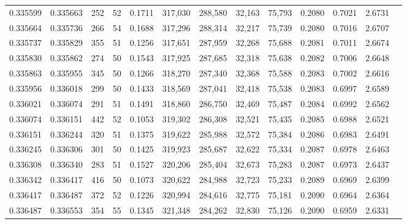 \begin{tabular}{rrrrrrrrrrrrr}
0.335599 & 0.335663 &   252 &  52 &                                     0.1711 & 317,030 & 288,580 &  32,163 &  75,793 & 0.2080 & 0.7021 & 2.6731 \\
0.335664 & 0.335736 &   266 &  54 &                                     0.1688 & 317,296 & 288,314 &  32,217 &  75,739 & 0.2080 & 0.7016 & 2.6707 \\
0.335737 & 0.335829 &   355 &  51 &                                     0.1256 & 317,651 & 287,959 &  32,268 &  75,688 & 0.2081 & 0.7011 & 2.6674 \\
0.335830 & 0.335862 &   274 &  50 &                                     0.1543 & 317,925 & 287,685 &  32,318 &  75,638 & 0.2082 & 0.7006 & 2.6648 \\
0.335863 & 0.335955 &   345 &  50 &                                     0.1266 & 318,270 & 287,340 &  32,368 &  75,588 & 0.2083 & 0.7002 & 2.6616 \\
0.335956 & 0.336018 &   299 &  50 &                                     0.1433 & 318,569 & 287,041 &  32,418 &  75,538 & 0.2083 & 0.6997 & 2.6589 \\
0.336021 & 0.336074 &   291 &  51 &                                     0.1491 & 318,860 & 286,750 &  32,469 &  75,487 & 0.2084 & 0.6992 & 2.6562 \\
0.336074 & 0.336151 &   442 &  52 &                                     0.1053 & 319,302 & 286,308 &  32,521 &  75,435 & 0.2085 & 0.6988 & 2.6521 \\
0.336151 & 0.336244 &   320 &  51 &                                     0.1375 & 319,622 & 285,988 &  32,572 &  75,384 & 0.2086 & 0.6983 & 2.6491 \\
0.336245 & 0.336306 &   301 &  50 &                                     0.1425 & 319,923 & 285,687 &  32,622 &  75,334 & 0.2087 & 0.6978 & 2.6463 \\
0.336308 & 0.336340 &   283 &  51 &                                     0.1527 & 320,206 & 285,404 &  32,673 &  75,283 & 0.2087 & 0.6973 & 2.6437 \\
0.336342 & 0.336417 &   416 &  50 &                                     0.1073 & 320,622 & 284,988 &  32,723 &  75,233 & 0.2089 & 0.6969 & 2.6399 \\
0.336417 & 0.336487 &   372 &  52 &                                     0.1226 & 320,994 & 284,616 &  32,775 &  75,181 & 0.2090 & 0.6964 & 2.6364 \\
0.336487 & 0.336553 &   354 &  55 &                                     0.1345 & 321,348 & 284,262 &  32,830 &  75,126 & 0.2090 & 0.6959 & 2.6331 \\

\end{tabular}
